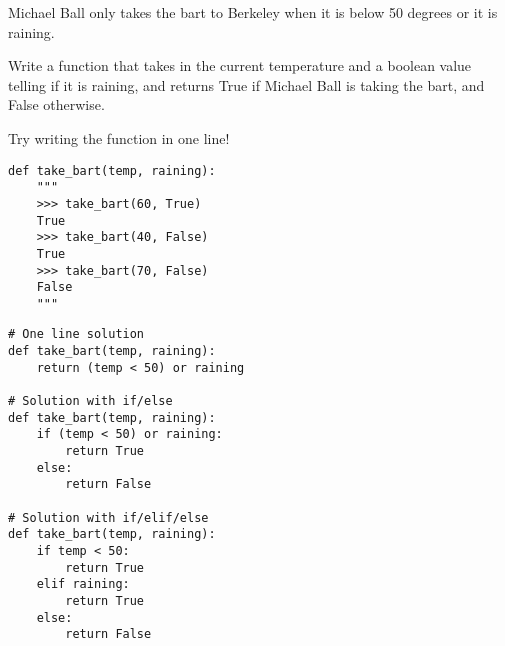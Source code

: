 \begin{blocksection}
\question Michael Ball only takes the bart to Berkeley when it is below 50 degrees or it is raining.

Write a function that takes in the current temperature and a boolean value telling if it is raining, and returns True if Michael Ball is taking the bart, and False otherwise.

Try writing the function in one line!

\begin{lstlisting}
def take_bart(temp, raining): 
    """
    >>> take_bart(60, True)
    True
    >>> take_bart(40, False)
    True
    >>> take_bart(70, False)
    False
    """

\end{lstlisting}

\begin{solution}[1.5in]
\begin{lstlisting}
# One line solution
def take_bart(temp, raining):
    return (temp < 50) or raining

# Solution with if/else
def take_bart(temp, raining):
    if (temp < 50) or raining:
    	return True
    else:
    	return False

# Solution with if/elif/else
def take_bart(temp, raining):
    if temp < 50:
    	return True
    elif raining:
        return True
    else:
    	return False
\end{lstlisting}
\end{solution}
\end{blocksection}
